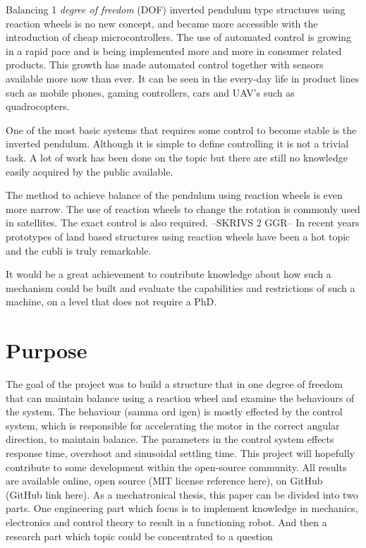 \documentclass[a4paper,11pt]{kth-mag}
\begin{document}
Balancing 1 \textit{degree of freedom} (DOF) inverted pendulum type structures using reaction wheels is no
new concept, and became more accessible with the introduction of cheap microcontrollers.
The use of automated control is growing in a rapid pace and is being implemented
more and more in consumer related products.  This growth
has made automated control together with sensors available more now than ever. It can be seen in the every-day life in product lines such as mobile phones, gaming controllers, cars and UAV’s such as quadrocopters.

One of the most basic systems that requires some control to become stable is the inverted pendulum. 
Although it is simple to define controlling it is not a trivial task. A lot of work has been done on the topic
but there are still no knowledge easily acquired by the public available. 

The method to achieve balance of the pendulum using reaction wheels is even more narrow. 
The use of reaction wheels to change the rotation is commonly used in satellites. The exact control is also required. --SKRIVS 2 GGR--
In recent years prototypes of land based structures using reaction wheels have been a hot topic and the cubli is truly remarkable.

It would be a great achievement to contribute knowledge about how such a mechanism could be built and evaluate
the capabilities and restrictions of such a machine, on a level that does not require a PhD.


\section{Purpose}
The goal of the project was to build a structure that in one degree of freedom that can maintain balance using a reaction wheel and examine the behaviours of the system.
The behaviour (samma ord igen) is mostly effected by the control system, which is responsible for accelerating the motor in the  correct angular direction, to maintain balance. The parameters in the control system effects response time, overshoot and sinusoidal settling time.
This project will hopefully contribute to some development within the open-source community.
All results are available online, open source (MIT license reference here), on GitHub (GitHub link here).
As a mechatronical thesis, this paper can be divided into two parts. One engineering part which focus is to implement knowledge in mechanics, electronics and control theory to result in a functioning robot. And then a research part which topic could be concentrated to a question 
\end{document}
